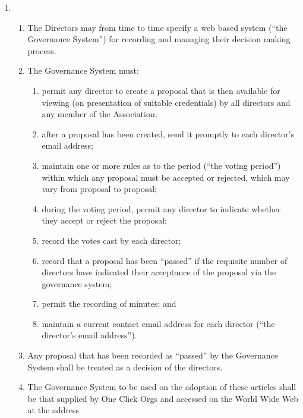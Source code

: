 \begin{enumerate}
\item
  \begin{enumerate}
    \item
    The Directors may from time to time specify a web based system (``the
    Governance System'') for recording and managing their decision making process.
    \item
    The Governance System must:
        \begin{enumerate}
            \item
             permit any director to create a proposal that is then available for viewing (on
             presentation of suitable credentials) by all directors and any member of the
             Association;
            \item
            after a proposal has been created, send it promptly to each director's email address;
            \item
             maintain one or more rules as to the period (``the voting period'') within which any
             proposal must be accepted or rejected, which may vary from proposal to proposal;
            \item
             during the voting period, permit any director to indicate whether they accept or reject
             the proposal;
            \item
             record the votes cast by each director;
            \item
             record that a proposal has been ``passed'' if the requisite number of directors have
             indicated their acceptance of the proposal via the governance system;
            \item
             permit the recording of minutes; and
            \item
             maintain a current contact email address for each director (``the director's email
             address'').
        \end{enumerate}
    \item
    Any proposal that has been recorded as ``passed'' by the Governance System shall
    be treated as a decision of the directors.
    \item
    The Governance System to be used on the adoption of these articles shall be that
    supplied by One Click Orgs and accessed on the World Wide Web at the address
  \end{enumerate}


\end{enumerate}
